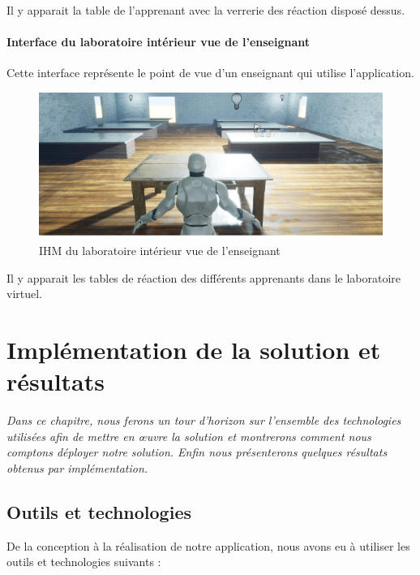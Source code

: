 Il y apparait la table de l'apprenant avec la verrerie des réaction disposé dessus.

\subsubsection{Interface du laboratoire intérieur vue de l'enseignant}

Cette interface représente le point de vue d'un enseignant qui utilise l'application.

\begin{figure}[H]
	\centering
	\includegraphics[width=1\textwidth]{img/labo3}
	\caption{IHM du laboratoire intérieur vue de l'enseignant}
	\label{fig:mesh1}
\end{figure}

Il y apparait les tables de réaction des différents apprenants dans le laboratoire virtuel.


\chapter{Implémentation de la solution et résultats}
\textit{Dans ce chapitre, nous ferons un tour d’horizon sur l’ensemble des technologies utilisées
	afin de mettre en œuvre la solution et montrerons comment nous comptons déployer notre
	solution. Enfin nous présenterons quelques résultats obtenus par implémentation.}
\clearpage

\section{Outils et technologies}

De la conception à la réalisation de notre application, nous avons eu à utiliser les outils et technologies suivants :

